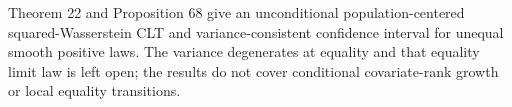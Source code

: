 Theorem 22 and Proposition 68 give an unconditional population-centered squared-Wasserstein CLT and variance-consistent confidence interval for unequal smooth positive laws. The variance degenerates at equality and that equality limit law is left open; the results do not cover conditional covariate-rank growth or local equality transitions.